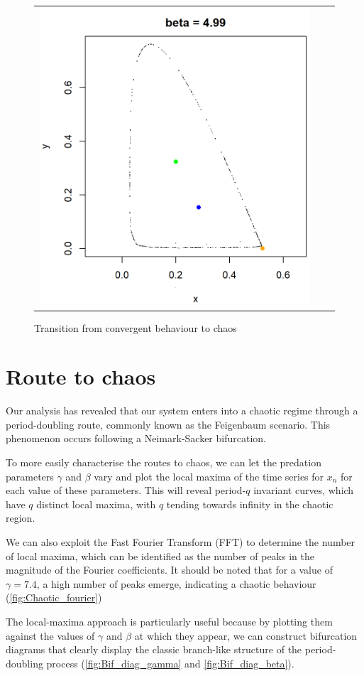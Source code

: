 \documentclass[10pt]{Configuration_Files/PoliMi3i_thesis}
\begin{document}
\begin{figure}[!htb]
\begin{tabular}{ccc}
    \includegraphics[width=0.32\linewidth]{images/Chapter 6.2/unnamed-chunk-12-1.png}
    \end{tabular}
  
   \caption{Transition from convergent behaviour to chaos}
\end{figure}

\section{Route to chaos}

Our analysis has revealed that our system enters into a chaotic regime through a period-doubling route, commonly known as the Feigenbaum scenario. This phenomenon occurs following a Neimark-Sacker bifurcation.

To more easily characterise the routes to chaos, we can let the predation parameters $\gamma$ and $\beta$ vary and plot the local maxima of the time series for $x_n$ for each value of these parameters. This will reveal period-$q$ invariant curves, which have $q$ distinct local maxima, with $q$ tending towards infinity in the chaotic region.

We can also exploit the Fast Fourier Transform (FFT) to determine the number of local maxima, which can be identified as the number of peaks in the magnitude of the Fourier coefficients. It should be noted that for a value of $\gamma=7.4$, a high number of peaks emerge, indicating a chaotic behaviour (\autoref{fig:Chaotic_fourier})

The local-maxima approach is particularly useful because by plotting them against the values of $\gamma$ and $\beta$ at which they appear, we can construct bifurcation diagrams that clearly display the classic branch-like structure of the period-doubling process  (\autoref{fig:Bif_diag_gamma} and \autoref{fig:Bif_diag_beta}).
\end{document}
